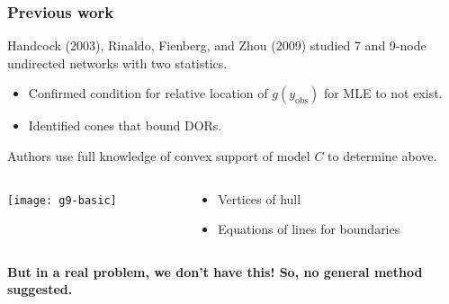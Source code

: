 \documentclass[slidestop,compress, 10pt]{beamer}
\newcommand{\yobs}{y_{\text{obs}}}
\begin{document}
%
%
\frame
{
  \frametitle{Previous work}  
Handcock (2003), Rinaldo, Fienberg, and Zhou (2009) studied 7 and 9-node undirected networks
with two statistics.
\begin{itemize}
	\item Confirmed condition for relative location of $g(\yobs)$ for MLE to not exist.  
	\item Identified cones that bound DORs.%
\end{itemize}

Authors use full knowledge of convex support of model $C$ to determine above.

\begin{columns}[]
\begin{column}[T]{0.4\textwidth}
\texttt{[image: g9-basic]}
\end{column}
\begin{column}[]{0.6\textwidth}
\begin{itemize}
\item Vertices of hull
\item Equations of lines for boundaries
\end{itemize}
\end{column}
\end{columns}
\textbf{But in a real problem, we don't have this!  So, no general method suggested.}

}

\end{document}
